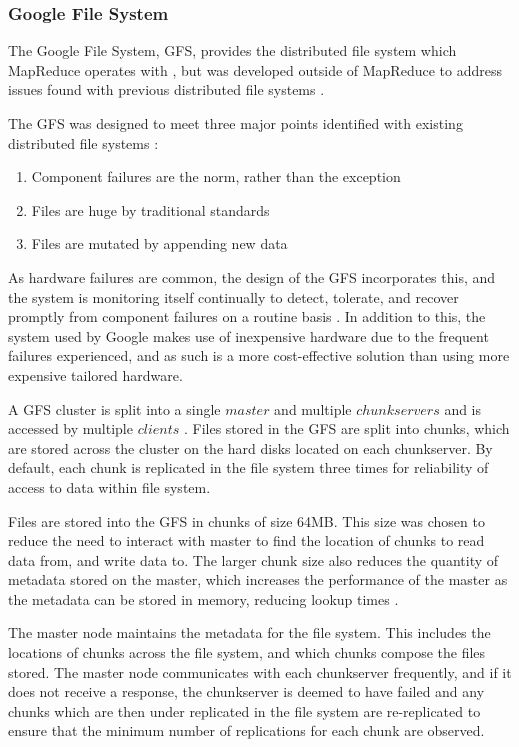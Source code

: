 \subsubsection{Google File System}
The Google File System, GFS, provides the distributed file system which MapReduce operates with \cite{mapreduce}, but was developed outside of MapReduce to address issues found with previous distributed file systems \cite{gfs}.

The GFS was designed to meet three major points identified with existing distributed file systems \cite{gfs}:
\begin{enumerate}
	\item Component failures are the norm, rather than the exception
	\item Files are huge by traditional standards
	\item Files are mutated by appending new data
\end{enumerate}

As hardware failures are common, the design of the GFS incorporates this, and the system is monitoring itself continually to detect, tolerate, and recover promptly from component failures on a routine basis \cite{gfs}. In addition to this, the system used by Google makes use of inexpensive hardware due to the frequent failures experienced, and as such is a more cost-effective solution than using more expensive tailored hardware.

A GFS cluster is split into a single $master$ and multiple $chunkservers$ and is accessed by multiple $clients$ \cite{gfs}. Files stored in the GFS are split into chunks, which are stored across the cluster on the hard disks located on each chunkserver. By default, each chunk is replicated in the file system three times for reliability of access to data within file system.

Files are stored into the GFS in chunks of size 64MB. This size was chosen to reduce the need to interact with master to find the location of chunks to read data from, and write data to. The larger chunk size also reduces the quantity of metadata stored on the master, which increases the performance of the master as the metadata can be stored in memory, reducing lookup times \cite{gfs}.

The master node maintains the metadata for the file system. This includes the locations of chunks across the file system, and which chunks compose the files stored. The master node communicates with each chunkserver frequently, and if it does not receive a response, the chunkserver is deemed to have failed and any chunks which are then under replicated in the file system are re-replicated to ensure that the minimum number of replications for each chunk are observed.



